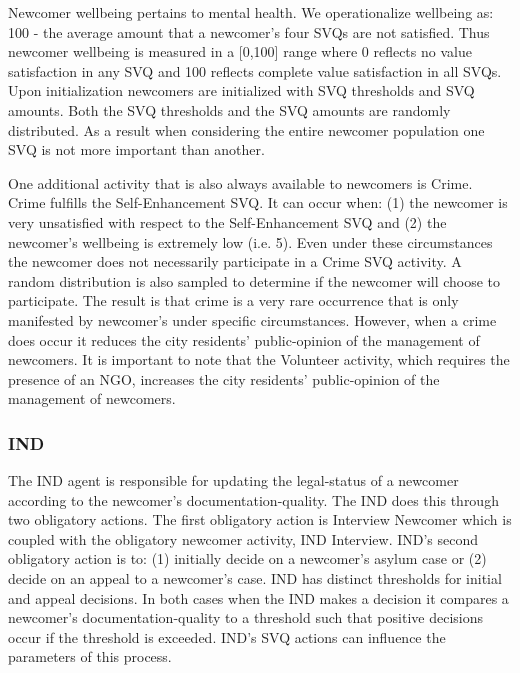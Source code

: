 \documentclass{scspaperproc}
\theoremstyle{scsthe}
\begin{document}
Newcomer wellbeing pertains to mental health. We operationalize wellbeing as: 100 - the average amount that a newcomer's four SVQs are not satisfied. Thus newcomer wellbeing is measured in a [0,100] range where 0 reflects no value satisfaction in any SVQ and 100 reflects complete value satisfaction in all SVQs. Upon initialization newcomers are initialized with SVQ thresholds and SVQ amounts. Both the SVQ thresholds and the SVQ amounts are randomly distributed. As a result when considering the entire newcomer population one SVQ is not more important than another.

One additional activity that is also always available to newcomers is Crime. Crime fulfills the Self-Enhancement SVQ. It can occur when: (1) the newcomer is very unsatisfied with respect to the Self-Enhancement SVQ and (2) the newcomer's wellbeing is extremely low (i.e. 5). Even under these circumstances the newcomer does not necessarily participate in a Crime SVQ activity. A random distribution is also sampled to determine if the newcomer will choose to participate. The result is that crime is a very rare occurrence that is only manifested by newcomer's under specific circumstances. However, when a crime does occur it reduces the city residents' public-opinion of the management of newcomers. It is important to note that the Volunteer activity, which requires the presence of an NGO, increases the city residents' public-opinion of the management of newcomers.

\subsubsection{IND}
The IND agent is responsible for updating the legal-status of a newcomer according to the newcomer's documentation-quality. The IND does this through two obligatory actions. The first obligatory action is Interview Newcomer which is coupled with the obligatory newcomer activity, IND Interview. IND's second obligatory action is to: (1) initially decide on a newcomer's asylum case or (2) decide on an appeal to a newcomer's case. IND has distinct thresholds for initial and appeal decisions. In both cases when the IND makes a decision it compares a newcomer's documentation-quality to a threshold such that positive decisions occur if the threshold is exceeded. IND's SVQ actions can influence the parameters of this process. 
\end{document}
